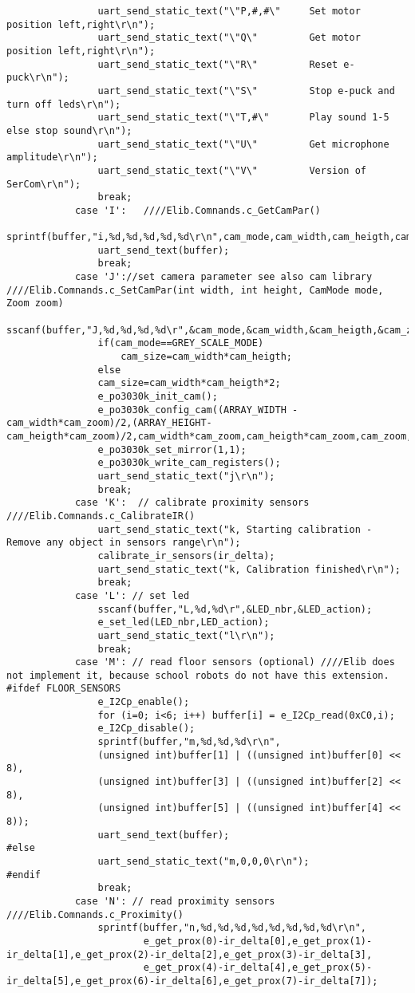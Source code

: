 \begin{lstlisting}
				uart_send_static_text("\"P,#,#\"     Set motor position left,right\r\n");
				uart_send_static_text("\"Q\"         Get motor position left,right\r\n");
				uart_send_static_text("\"R\"         Reset e-puck\r\n");
				uart_send_static_text("\"S\"         Stop e-puck and turn off leds\r\n");
				uart_send_static_text("\"T,#\"       Play sound 1-5 else stop sound\r\n");
				uart_send_static_text("\"U\"         Get microphone amplitude\r\n");
				uart_send_static_text("\"V\"         Version of SerCom\r\n");
				break;
			case 'I':   ////Elib.Comnands.c_GetCamPar()
				sprintf(buffer,"i,%d,%d,%d,%d,%d\r\n",cam_mode,cam_width,cam_heigth,cam_zoom,cam_size);
				uart_send_text(buffer);
				break;
			case 'J'://set camera parameter see also cam library ////Elib.Comnands.c_SetCamPar(int width, int height, CamMode mode, Zoom zoom)
				sscanf(buffer,"J,%d,%d,%d,%d\r",&cam_mode,&cam_width,&cam_heigth,&cam_zoom);
				if(cam_mode==GREY_SCALE_MODE)
					cam_size=cam_width*cam_heigth;
				else
				cam_size=cam_width*cam_heigth*2;
				e_po3030k_init_cam();
				e_po3030k_config_cam((ARRAY_WIDTH -cam_width*cam_zoom)/2,(ARRAY_HEIGHT-cam_heigth*cam_zoom)/2,cam_width*cam_zoom,cam_heigth*cam_zoom,cam_zoom,cam_zoom,cam_mode);
    			e_po3030k_set_mirror(1,1);
   				e_po3030k_write_cam_registers();
   				uart_send_static_text("j\r\n");
   				break;
			case 'K':  // calibrate proximity sensors ////Elib.Comnands.c_CalibrateIR()
				uart_send_static_text("k, Starting calibration - Remove any object in sensors range\r\n");
				calibrate_ir_sensors(ir_delta);
				uart_send_static_text("k, Calibration finished\r\n");
				break;
			case 'L': // set led
				sscanf(buffer,"L,%d,%d\r",&LED_nbr,&LED_action);
				e_set_led(LED_nbr,LED_action);
				uart_send_static_text("l\r\n");
				break;
			case 'M': // read floor sensors (optional) ////Elib does not implement it, because school robots do not have this extension.
#ifdef FLOOR_SENSORS
				e_I2Cp_enable();
				for (i=0; i<6; i++)	buffer[i] = e_I2Cp_read(0xC0,i);
				e_I2Cp_disable();
				sprintf(buffer,"m,%d,%d,%d\r\n",
				(unsigned int)buffer[1] | ((unsigned int)buffer[0] << 8),
				(unsigned int)buffer[3] | ((unsigned int)buffer[2] << 8),
				(unsigned int)buffer[5] | ((unsigned int)buffer[4] << 8));
				uart_send_text(buffer);
#else
				uart_send_static_text("m,0,0,0\r\n");
#endif
				break;
			case 'N': // read proximity sensors ////Elib.Comnands.c_Proximity()
				sprintf(buffer,"n,%d,%d,%d,%d,%d,%d,%d,%d\r\n",
				        e_get_prox(0)-ir_delta[0],e_get_prox(1)-ir_delta[1],e_get_prox(2)-ir_delta[2],e_get_prox(3)-ir_delta[3],
				        e_get_prox(4)-ir_delta[4],e_get_prox(5)-ir_delta[5],e_get_prox(6)-ir_delta[6],e_get_prox(7)-ir_delta[7]);

\end{lstlisting}

